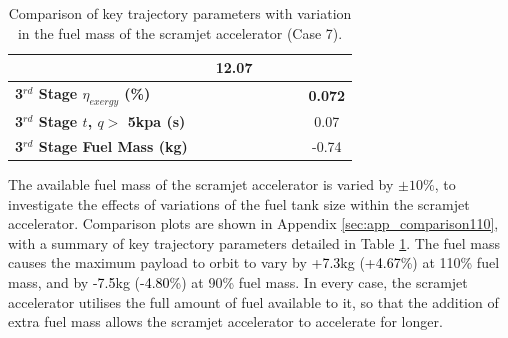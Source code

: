 \begin{table}[!ht]
\begin{tabular}{l c c c c c c}
	& \SecondDistmFuelOneHundredTenNoReturn
	&12.07
	\\
	\hline 
	\textbf{3$^{rd}$ Stage $\eta_{exergy}$ (\%)}
	& \textbf{\thirddExergyEffmFuelNinetyNoReturn}
	& \textbf{\thirddExergyEffmFuelNinetyFiveNoReturn}
	& \textbf{\thirddExergyEffmFuelStandardNoReturn}
	& \textbf{\thirddExergyEffmFuelOneHundredFiveNoReturn}
	& \textbf{\thirddExergyEffmFuelOneHundredTenNoReturn}
	& \textbf{0.072}
	\\
	\textbf{3$^{rd}$ Stage $t$, $q >$ 5kpa (s)}
	& \thirdqOverFivemFuelNinetyNoReturn
	& \thirdqOverFivemFuelNinetyFiveNoReturn
	& \thirdqOverFivemFuelStandardNoReturn
	& \thirdqOverFivemFuelOneHundredFiveNoReturn
	& \thirdqOverFivemFuelOneHundredTenNoReturn
	&0.07
	\\
	\textbf{3$^{rd}$ Stage Fuel Mass (kg)}
	& \thirdmFuelmFuelNinetyNoReturn
	& \thirdmFuelmFuelNinetyFiveNoReturn
	& \thirdmFuelmFuelStandardNoReturn
	& \thirdmFuelmFuelOneHundredFiveNoReturn
	& \thirdmFuelmFuelOneHundredTenNoReturn
	&-0.74
	\\
	\hline 
\end{tabular} 

\caption{Comparison of key trajectory parameters with variation in the fuel mass of the scramjet accelerator (Case 7).}
\label{tab:comparison110}
\end{table}
\noindent
The available fuel mass of the scramjet accelerator is varied by $\pm 10\%$, to investigate the effects of variations of the fuel tank size within the scramjet accelerator. Comparison plots are shown in Appendix \ref{sec:app_comparison110}, with a summary of key trajectory parameters detailed in Table \ref{tab:comparison110}.
The fuel mass causes the maximum payload to orbit to vary by \textcolor{black}{+7.3}kg (\textcolor{black}{+4.67}\%) at 110\% fuel mass, and by \textcolor{black}{-7.5}kg (\textcolor{black}{-4.80}\%) at 90\% fuel mass. 
 In every case, the scramjet accelerator utilises the full amount of fuel available to it, so that the addition of extra fuel mass allows the scramjet accelerator to accelerate for longer. 

